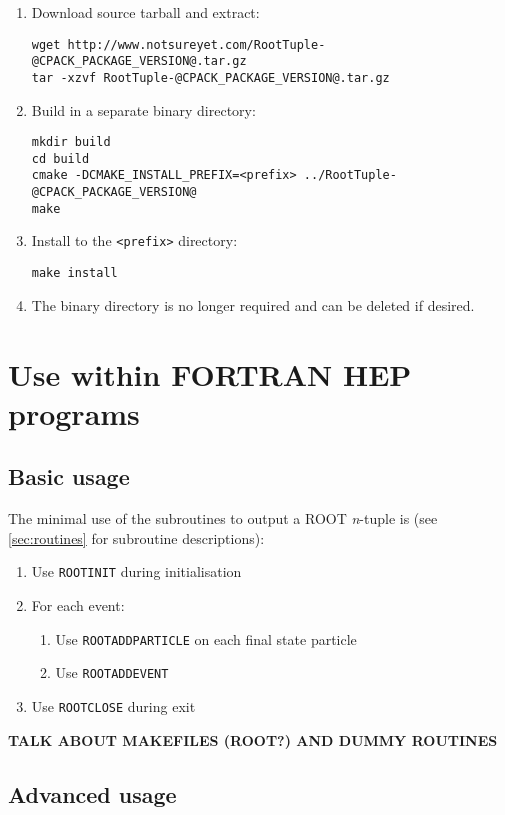 \documentclass[a4paper,12pt]{article}
\begin{document}
\begin{enumerate}
    \item Download source tarball and extract:\begin{verbatim}
wget http://www.notsureyet.com/RootTuple-@CPACK_PACKAGE_VERSION@.tar.gz
tar -xzvf RootTuple-@CPACK_PACKAGE_VERSION@.tar.gz\end{verbatim}
    \item Build in a separate binary directory:\begin{verbatim}
mkdir build
cd build
cmake -DCMAKE_INSTALL_PREFIX=<prefix> ../RootTuple-@CPACK_PACKAGE_VERSION@
make\end{verbatim}
    \item Install to the \verb|<prefix>| directory:\begin{verbatim}
make install\end{verbatim}
    \item The binary directory is no longer required and can be deleted if desired.
\end{enumerate}

\section{Use within FORTRAN HEP programs}
\label{sec:usage}
\subsection{Basic usage}
The minimal use of the subroutines to output a ROOT \emph{n}-tuple is (see \textsection\ref{sec:routines} for subroutine descriptions):
\begin{enumerate}
    \item Use \verb|ROOTINIT| during initialisation
    \item For each event:
    \begin{enumerate}
        \item Use \verb|ROOTADDPARTICLE| on each final state particle
        \item Use \verb|ROOTADDEVENT|
    \end{enumerate}
    \item Use \verb|ROOTCLOSE| during exit
\end{enumerate}

\uppercase{\textbf{Talk about makefiles (ROOT?) and dummy routines}}

\subsection{Advanced usage}
\end{document}
